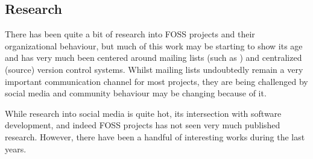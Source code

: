\documentclass[a4paper,11pt]{article} %
\begin{document}
\subsection{Research}
There has been quite a bit of research into FOSS projects and their
organizational behaviour, but much of this work may be starting to show its
age and has very much been centered around mailing lists (such as
\cite{Oezbek10Cancer, singh2011network}) and centralized (source) version
control systems. Whilst mailing lists undoubtedly remain a very important
communication channel for most projects, they are being challenged by social
media and community behaviour may be changing because of it.

While research into social media is quite hot, its intersection with
software development, and indeed FOSS projects has not seen very much
published research. However, there have been a handful of interesting works
during the last years.
\end{document}
